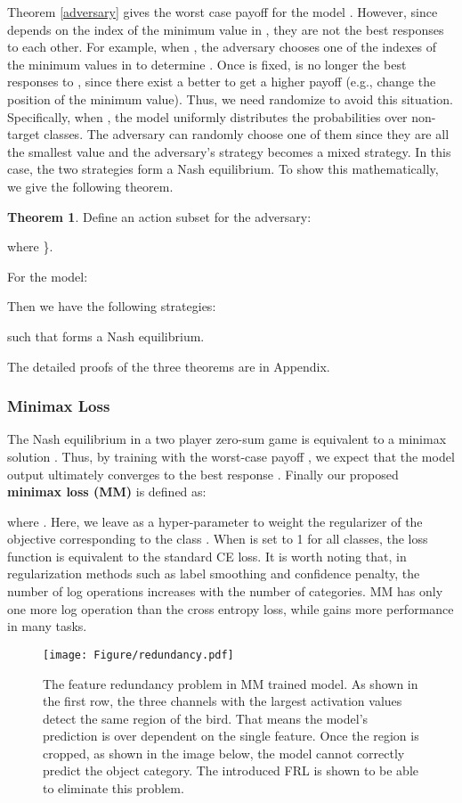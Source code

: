 \documentclass{article}
\theoremstyle{definition}
\newtheorem{theorem}{Theorem}
\begin{document}
Theorem \ref{adversary} gives the worst case payoff for the model . However, since  depends on the index of the minimum value in , they are not the best responses to each other. For example, when , the adversary chooses one of the indexes of the minimum values in  to determine . Once  is fixed,  is no longer the best responses to , since there exist a better  to get a higher payoff (e.g., change the position of the minimum value). Thus, we need randomize  to avoid this situation. Specifically, when , the model uniformly distributes the probabilities over non-target classes. The adversary can randomly choose one of them since they are all the smallest value and the adversary's strategy becomes a mixed strategy. In this case, the two strategies form a Nash equilibrium. To show this mathematically, we give the following theorem.
\begin{theorem}
    Define an action subset for the adversary:
    
    where \}. 
    
    For the model:
    
    Then we have the following strategies: 
    
    
    such that  forms a Nash equilibrium.
    \label{the:theorem 3}
\end{theorem}
The detailed proofs of the three theorems are in Appendix.

\subsubsection{Minimax Loss}
The Nash equilibrium in a two player zero-sum game is equivalent to a minimax solution \cite{ferreira2012minimax}. Thus, by training with the worst-case payoff , we expect that the model output ultimately converges to the best response .
Finally our proposed \textbf{minimax loss (MM)} is defined as: 


where .
Here, we leave  as a hyper-parameter to weight the regularizer of the objective corresponding to the class . When  is set to 1 for all classes, the loss function is equivalent to the standard CE loss. It is worth noting that, in regularization methods such as label smoothing and confidence penalty, the number of log operations increases with the number of categories. MM has only one more log operation than the cross entropy loss, while gains more performance in many tasks.

\begin{figure}[tb]
    \centering
    \texttt{[image: Figure/redundancy.pdf]}
    \caption{The feature redundancy problem in MM trained model. As shown in the first row, the three channels with the largest activation values detect the same region of the bird. That means the model's prediction is over dependent on the single feature. Once the region is cropped, as shown in the image below, the model cannot correctly predict the object category. The introduced FRL is shown to be able to eliminate this problem.}
    \label{fig:redundancy}
\end{figure}
\end{document}
